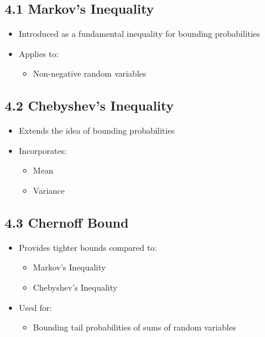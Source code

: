 \documentclass[12pt]{article}
\begin{document}
\subsection*{4.1 Markov’s Inequality}

\begin{itemize}
    \item Introduced as a fundamental inequality for bounding probabilities  
    \item Applies to:
    \begin{itemize}
        \item Non-negative random variables  
    \end{itemize}
\end{itemize}

\subsection*{4.2 Chebyshev’s Inequality}

\begin{itemize}
    \item Extends the idea of bounding probabilities  
    \item Incorporates:
    \begin{itemize}
        \item Mean  
        \item Variance  
    \end{itemize}
\end{itemize}

\subsection*{4.3 Chernoff Bound}

\begin{itemize}
    \item Provides tighter bounds compared to:
    \begin{itemize}
        \item Markov’s Inequality  
        \item Chebyshev’s Inequality  
    \end{itemize}
    \item Used for:
    \begin{itemize}
        \item Bounding tail probabilities of sums of random variables  
    \end{itemize}
\end{itemize}
\end{document}
